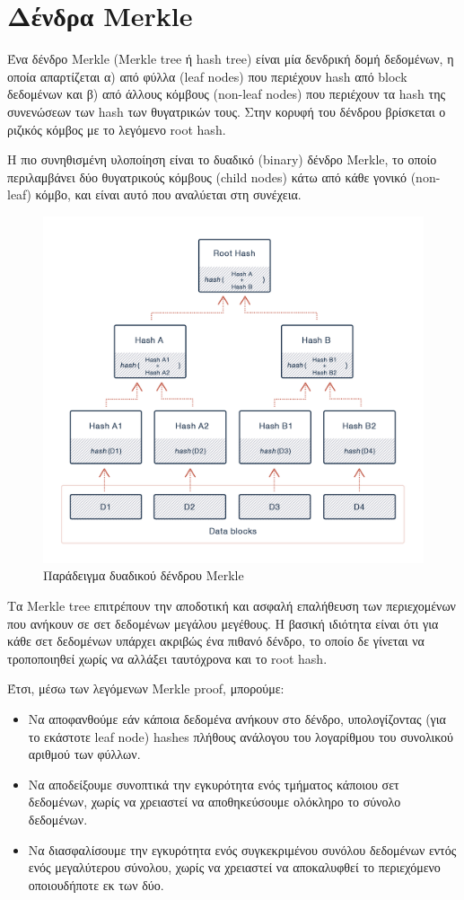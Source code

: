 \section{Δένδρα Merkle} \label{section:2-3-merkle-trees}

Ένα δένδρο Merkle (Merkle tree ή hash tree) είναι μία δενδρική δομή δεδομένων, η οποία απαρτίζεται α) από φύλλα (leaf nodes) που περιέχουν hash από block δεδομένων και β) από άλλους κόμβους (non-leaf nodes) που περιέχουν τα hash της συνενώσεων των hash των θυγατρικών τους. Στην κορυφή του δένδρου βρίσκεται ο ριζικός κόμβος με το λεγόμενο root hash.

Η πιο συνηθισμένη υλοποίηση είναι το δυαδικό (binary) δένδρο Merkle, το οποίο περιλαμβάνει δύο θυγατρικούς κόμβους (child nodes) κάτω από κάθε γονικό (non-leaf) κόμβο, και είναι αυτό που αναλύεται στη συνέχεια.

\begin{figure}[H]
	\centering
	\includegraphics[width=.85\textwidth]{assets/figures/chapter-2/2.3.merkle-tree.png}
	\caption{Παράδειγμα δυαδικού δένδρου Merkle}
\end{figure}

Τα Merkle tree επιτρέπουν την αποδοτική και ασφαλή επαλήθευση των περιεχομένων που ανήκουν σε σετ δεδομένων μεγάλου μεγέθους. Η βασική ιδιότητα είναι ότι για κάθε σετ δεδομένων υπάρχει ακριβώς ένα πιθανό δένδρο, το οποίο δε γίνεται να τροποποιηθεί χωρίς να αλλάξει ταυτόχρονα και το root hash. 

Έτσι, μέσω των λεγόμενων Merkle proof, μπορούμε:
\begin{itemize}
	\item Να αποφανθούμε εάν κάποια δεδομένα ανήκουν στο δένδρο, υπολογίζοντας (για το εκάστοτε leaf node) hashes πλήθους ανάλογου του λογαρίθμου του συνολικού αριθμού των φύλλων.
	\item Να αποδείξουμε συνοπτικά την εγκυρότητα ενός τμήματος κάποιου σετ δεδομένων, χωρίς να χρειαστεί να αποθηκεύσουμε ολόκληρο το σύνολο δεδομένων.
	\item Να διασφαλίσουμε την εγκυρότητα ενός συγκεκριμένου συνόλου δεδομένων εντός ενός μεγαλύτερου σύνολου, χωρίς να χρειαστεί να αποκαλυφθεί το περιεχόμενο οποιουδήποτε εκ των δύο.\cite{2.3-merkle-proofs-explained} 
\end{itemize}
